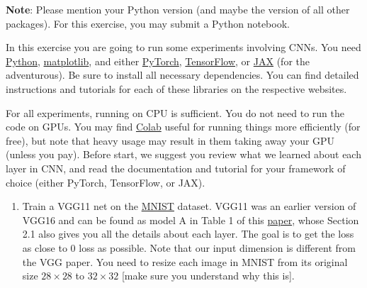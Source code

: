 \documentclass[10pt,letter,notitlepage]{article}
\newcommand{\blue}[1]{{\color{blue}#1}}
\newcommand{\magenta}[1]{{\color{magenta}#1}}
\newcounter{exercise}
\begin{document}
\begin{exercise}
	\blue{\textbf{Note}: Please mention your Python version (and maybe the version of all other packages). For this exercise, you may submit a Python notebook.}
	
	
  In this exercise you are going to run some experiments involving CNNs. You need \href{https://www.python.org/}{\magenta{Python}}, \href{https://matplotlib.org/}{\magenta{matplotlib}}, and either \href{https://pytorch.org/get-started/locally/}{\magenta{PyTorch}},  \href{https://www.tensorflow.org/tutorials/quickstart/beginner}{\magenta{TensorFlow}}, or \href{https://jax.readthedocs.io/en/latest/notebooks/quickstart.html}{\magenta{JAX}} (for the adventurous). Be sure to install all necessary dependencies. You can find detailed instructions and tutorials for each of these libraries on the respective websites. 
	
	For all experiments, running on CPU is sufficient. 
  You do not need to run the code on GPUs.
  You may find \href{https://colab.research.google.com/}{Colab} useful for running things more efficiently (for free), but note that heavy usage may result in them taking away your GPU (unless you pay).
  Before start, we suggest you review what we learned about each layer in CNN, and read the documentation and tutorial for your framework of choice (either PyTorch, TensorFlow, or JAX).
	
  \begin{enumerate}[label=\alph*)]
		\item Train a VGG11 net on the \href{http://yann.lecun.com/exdb/mnist/}{\magenta{MNIST}} dataset. 
		VGG11 was an earlier version of VGG16 and can be found as model A in Table 1 of this \href{https://arxiv.org/pdf/1409.1556.pdf}{\magenta{paper}}, whose Section 2.1 also gives you all the details about each layer.
		The goal is to get the loss as close to 0 loss as possible. Note that our input dimension is different from the VGG paper. You need to resize each image in MNIST from its original size $28 \times 28$ to $32 \times 32$ [make sure you understand why this is].
		

\end{enumerate}
\end{exercise}
\end{document}
